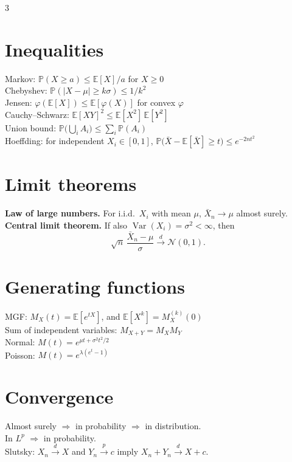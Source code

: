 \documentclass[9pt,landscape,a4paper]{extarticle}
\newcommand{\E}{\mathbb{E}}
\newcommand{\Var}{\operatorname{Var}}
\renewcommand{\P}{\mathbb{P}}
\begin{document}
\begin{multicols*}{3}
\section{Inequalities}
Markov: $\P(X \ge a) \le \E[X] / a$ for $X \ge 0$ \\
Chebyshev: $\P(|X - \mu| \ge k\sigma) \le 1/k^2$ \\
Jensen: $\varphi(\E[X]) \le \E[\varphi(X)]$ for convex $\varphi$ \\
Cauchy--Schwarz: $\E[XY]^2 \le \E[X^2]\,\E[Y^2]$ \\
Union bound: $\P\bigl(\bigcup_i A_i\bigr) \le \sum_i \P(A_i)$ \\
Hoeffding: for independent $X_i \in [0, 1]$, $\P\bigl(\bar{X} - \E[\bar{X}] \ge t\bigr) \le e^{-2nt^2}$

\section{Limit theorems}
\textbf{Law of large numbers.} For i.i.d.\ $X_i$ with mean $\mu$, $\bar{X}_n \to \mu$ almost surely. \\[2pt]
\textbf{Central limit theorem.} If also $\Var(X_i) = \sigma^2 < \infty$, then
\[
  \sqrt{n}\,\frac{\bar{X}_n - \mu}{\sigma} \xrightarrow{d} \mathcal{N}(0, 1).
\]

\section{Generating functions}
MGF: $M_X(t) = \E[e^{tX}]$, and $\E[X^k] = M_X^{(k)}(0)$ \\
Sum of independent variables: $M_{X+Y} = M_X M_Y$ \\
Normal: $M(t) = e^{\mu t + \sigma^2 t^2 / 2}$ \\
Poisson: $M(t) = e^{\lambda(e^t - 1)}$

\section{Convergence}
Almost surely $\Rightarrow$ in probability $\Rightarrow$ in distribution. \\
In $L^p$ $\Rightarrow$ in probability. \\
Slutsky: $X_n \xrightarrow{d} X$ and $Y_n \xrightarrow{p} c$ imply $X_n + Y_n \xrightarrow{d} X + c$.

\end{multicols*}
\end{document}
